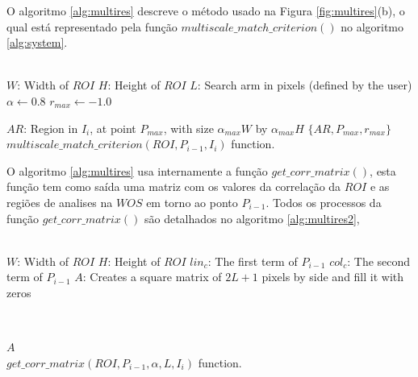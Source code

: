 O algoritmo \ref{alg:multires} descreve o método usado na Figura \ref{fig:multires}(b), o qual
está representado pela função $multiscale\_match\_criterion()$ no algoritmo \ref{alg:system}.
\begin{algorithm}
 ~\\
 $W$: Width of $ROI$\;
 $H$: Height of $ROI$\;
 $L$: Search arm in pixels (defined by the user)\;
 $\alpha \leftarrow 0.8$\;
 $r_{max} \leftarrow -1.0$\;
 ~\\
    
$AR$: Region in $I_i$, at point $P_{max}$, with size $\alpha_{max} W$ by $\alpha_{max} H$\;      
\Return $\{AR,P_{max},r_{max}\}$\;
~\\
\caption{$multiscale\_match\_criterion(ROI,P_{i-1},I_i)$ function.}
\label{alg:multires}
\end{algorithm}
O algoritmo \ref{alg:multires} usa internamente a função $get\_corr\_matrix()$,
esta função tem como saída uma matriz com os valores da correlação da $ROI$ e as regiões de analises na $WOS$
em torno ao ponto $P_{i-1}$. Todos os processos da função $get\_corr\_matrix()$ são detalhados no algoritmo
\ref{alg:multires2},
\begin{algorithm}
 ~\\
 $W$: Width of $ROI$\;
 $H$: Height of $ROI$\;
 $lin_c$: The first term of $P_{i-1}$\;
 $col_c$: The second term of $P_{i-1}$\;
 $A$: Creates a square matrix of $2L+1$ pixels by side and fill it with zeros\;

 ~\\
    
\Return $A$\;
~\\
\caption{$get\_corr\_matrix(ROI,P_{i-1},\alpha,L,I_i)$ function.}
\label{alg:multires2}
\end{algorithm}
